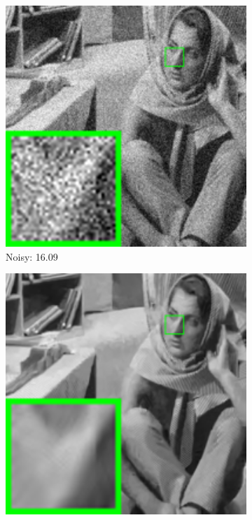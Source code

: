 \begin{figure}
\begin{adjustwidth}{-2cm}{}
\begin{subfigure}[t]{0.19\textwidth}
        \includegraphics[width=1\textwidth]{images/twsc/awgn/resize_br_40_barbara.png}
		\caption{Noisy: 16.09}
    \end{subfigure}
    \hfill
    \begin{subfigure}[t]{0.19\textwidth}
        \centering
        \includegraphics[width=1\textwidth]{images/twsc/awgn/resize_br_BM3D_40_barbara.png}

\end{subfigure}
\end{adjustwidth}
\end{figure}
